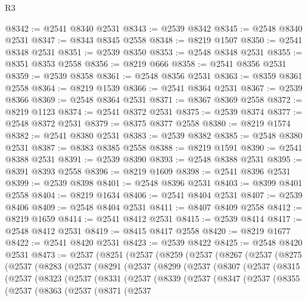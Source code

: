 \begin{lexlean}{R3}
\begin{coremodule}
@8342 := @2541 @8340 @2531
@8343 := @2539 @8342
@8345 := @2548 @8340 @2531
@8347 := @8343 @8345 @2558
@8348 := @8219 @1507
@8350 := @2541 @8348 @2531
@8351 := @2539 @8350
@8353 := @2548 @8348 @2531
@8355 := @8351 @8353 @2558
@8356 := @8219 @666
@8358 := @2541 @8356 @2531
@8359 := @2539 @8358
@8361 := @2548 @8356 @2531
@8363 := @8359 @8361 @2558
@8364 := @8219 @1539
@8366 := @2541 @8364 @2531
@8367 := @2539 @8366
@8369 := @2548 @8364 @2531
@8371 := @8367 @8369 @2558
@8372 := @8219 @1123
@8374 := @2541 @8372 @2531
@8375 := @2539 @8374
@8377 := @2548 @8372 @2531
@8379 := @8375 @8377 @2558
@8380 := @8219 @1574
@8382 := @2541 @8380 @2531
@8383 := @2539 @8382
@8385 := @2548 @8380 @2531
@8387 := @8383 @8385 @2558
@8388 := @8219 @1591
@8390 := @2541 @8388 @2531
@8391 := @2539 @8390
@8393 := @2548 @8388 @2531
@8395 := @8391 @8393 @2558
@8396 := @8219 @1609
@8398 := @2541 @8396 @2531
@8399 := @2539 @8398
@8401 := @2548 @8396 @2531
@8403 := @8399 @8401 @2558
@8404 := @8219 @1634
@8406 := @2541 @8404 @2531
@8407 := @2539 @8406
@8409 := @2548 @8404 @2531
@8411 := @8407 @8409 @2558
@8412 := @8219 @1659
@8414 := @2541 @8412 @2531
@8415 := @2539 @8414
@8417 := @2548 @8412 @2531
@8419 := @8415 @8417 @2558
@8420 := @8219 @1677
@8422 := @2541 @8420 @2531
@8423 := @2539 @8422
@8425 := @2548 @8420 @2531
@8473 := @2537
    (@8251
      (@2537
        (@8259
          (@2537
            (@8267
              (@2537
                (@8275
                  (@2537
                    (@8283
                      (@2537
                        (@8291
                          (@2537
                            (@8299
                              (@2537
                                (@8307
                                  (@2537
                                    (@8315
                                      (@2537
                                        (@8323
                                          (@2537
                                            (@8331
                                              (@2537
                                                (@8339
                                                  (@2537
                                                    (@8347
                                                      (@2537
                                                        (@8355
                                                          (@2537
                                                            (@8363
                                                              (@2537
                                                                (@8371
                                                                  (@2537

\end{coremodule}
\end{lexlean}
